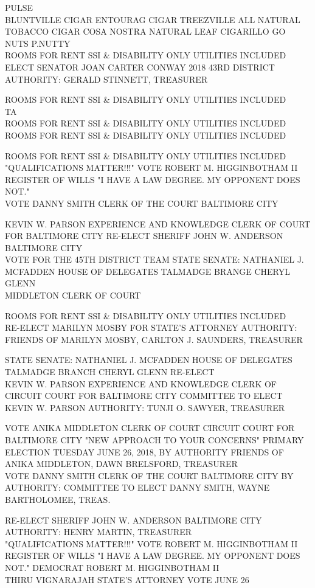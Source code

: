 \documentclass[10pt,letterpaper]{article}
\begin{document}
PULSE\\
BLUNTVILLE CIGAR ENTOURAG CIGAR TREEZVILLE ALL NATURAL TOBACCO CIGAR COSA NOSTRA NATURAL LEAF CIGARILLO GO NUTS P.NUTTY\\
ROOMS FOR RENT SSI \& DISABILITY ONLY UTILITIES INCLUDED\\
ELECT SENATOR JOAN CARTER CONWAY 2018 43RD DISTRICT AUTHORITY: GERALD STINNETT, TREASURER

ROOMS FOR RENT SSI \& DISABILITY ONLY UTILITIES INCLUDED\\
TA\\
ROOMS FOR RENT SSI \& DISABILITY ONLY UTILITIES INCLUDED\\
ROOMS FOR RENT SSI \& DISABILITY ONLY UTILITIES INCLUDED

ROOMS FOR RENT SSI \& DISABILITY ONLY UTILITIES INCLUDED\\
"QUALIFICATIONS MATTER!!!" VOTE ROBERT M. HIGGINBOTHAM II REGISTER OF WILLS "I HAVE A LAW DEGREE.  MY OPPONENT DOES NOT."\\
VOTE DANNY SMITH CLERK OF THE COURT BALTIMORE CITY

KEVIN W. PARSON EXPERIENCE AND KNOWLEDGE CLERK OF COURT FOR BALTIMORE CITY RE{-}ELECT SHERIFF JOHN W. ANDERSON BALTIMORE CITY\\
VOTE FOR THE 45TH DISTRICT TEAM STATE SENATE: NATHANIEL J. MCFADDEN HOUSE OF DELEGATES TALMADGE BRANGE CHERYL GLENN\\
MIDDLETON CLERK OF COURT

ROOMS FOR RENT SSI \& DISABILITY ONLY UTILITIES INCLUDED\\
RE{-}ELECT MARILYN MOSBY FOR STATE'S ATTORNEY AUTHORITY: FRIENDS OF MARILYN MOSBY, CARLTON J. SAUNDERS, TREASURER

STATE SENATE: NATHANIEL J. MCFADDEN HOUSE OF DELEGATES TALMADGE BRANCH CHERYL GLENN RE{-}ELECT\\
KEVIN W. PARSON EXPERIENCE AND KNOWLEDGE CLERK OF CIRCUIT COURT FOR BALTIMORE CITY COMMITTEE TO ELECT KEVIN W. PARSON AUTHORITY: TUNJI O. SAWYER, TREASURER

VOTE ANIKA MIDDLETON CLERK OF COURT CIRCUIT COURT FOR BALTIMORE CITY "NEW APPROACH TO YOUR CONCERNS" PRIMARY ELECTION TUESDAY JUNE 26, 2018, BY AUTHORITY FRIENDS OF ANIKA MIDDLETON, DAWN BRELSFORD, TREASURER\\
VOTE DANNY SMITH CLERK OF THE COURT BALTIMORE CITY BY AUTHORITY: COMMITTEE TO ELECT DANNY SMITH, WAYNE BARTHOLOMEE, TREAS.

RE{-}ELECT SHERIFF JOHN W. ANDERSON BALTIMORE CITY AUTHORITY: HENRY MARTIN, TREASURER\\
"QUALIFICATIONS MATTER!!!" VOTE ROBERT M. HIGGINBOTHAM II REGISTER OF WILLS "I HAVE A LAW DEGREE.  MY OPPONENT DOES NOT."  DEMOCRAT ROBERT M. HIGGINBOTHAM II\\
THIRU VIGNARAJAH STATE'S ATTORNEY VOTE JUNE 26
\end{document}
